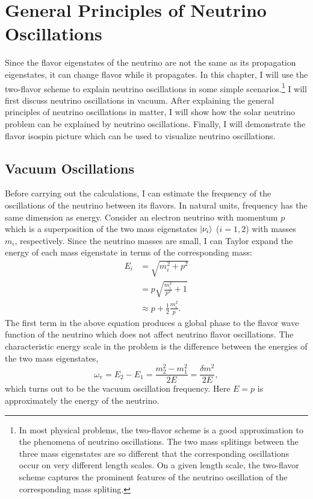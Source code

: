 

\chapter{\label{chap:basics}General Principles of Neutrino Oscillations}

Since the flavor eigenstates of the neutrino are not the same as its propagation eigenstates, it can change flavor while it propagates.
In this chapter, I will use the two-flavor scheme to explain neutrino oscillations in some simple scenarios.\footnote{In most physical problems, the two-flavor scheme is a good approximation to the phenomena of neutrino oscillations. The two mass splitings between the three mass eigenstates are so different that the corresponding oscillations occur on very different length scales. On a given length scale, the two-flavor scheme captures the prominent features of the neutrino oscillation of the corresponding mass spliting.}
I will first discuss neutrino oscillations in vacuum. After explaining the general principles of neutrino oscillations in matter, I will show how the solar neutrino problem can be explained by neutrino oscillations. Finally, I will demonstrate the flavor isospin picture which can be used to visualize neutrino oscillations.


\section{\label{chap:basics-sec:vacuum-oscillations}Vacuum Oscillations}

Before carrying out the calculations, I can estimate the frequency of the oscillations of the neutrino between its flavors. In natural units, frequency has the same dimension as energy.
Consider an electron neutrino with momentum $p$ which is a superposition of the two mass eigenstates $\left| \nu_i\right\rangle$ ($i=1,2$) with masses $m_i$, respectively. Since the neutrino masses are small, I can Taylor expand the energy of each mass eigenstate in terms of the corresponding mass:
\begin{align}
E_i & = \sqrt{m_i^2 + p^2 } \nonumber\\
& = p \sqrt{\frac{m_i^2}{p^2} + 1} \nonumber\\
& \approx p + \frac{1}{2} \frac{m_i^2}{p}.
\label{chap:basics-section:neutrinos-eqn:energy-taylor}
\end{align}
The first term in the above equation produces a global phase to the flavor wave function of the neutrino which does not affect neutrino flavor oscillations. The characteristic energy scale in the problem is the difference between the energies of the two mass eigenstates,
\begin{equation}
    \omega_{\mathrm v} = E_2-E_1 =  \frac{m_2^2-m_1^2}{2E} = \frac{\delta m^2}{2E},
    \label{chap:basics-section:neutrinos-eqn:qualitative-method-frequency}
\end{equation}
which turns out to be the vacuum oscillation frequency. Here $E=p$ is approximately the energy of the neutrino.


